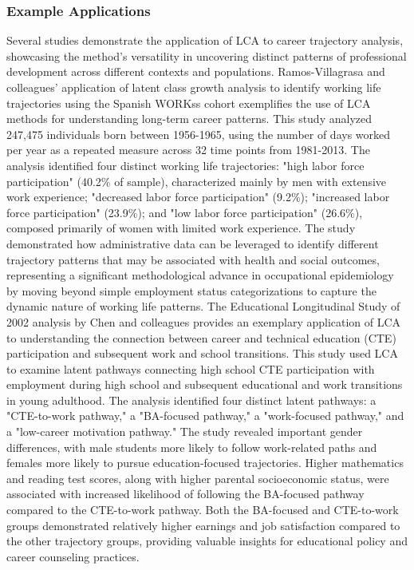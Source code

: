 \documentclass[main.tex]{subfiles}
\begin{document}
\subsubsection{Example Applications}
Several studies demonstrate the application of LCA to career trajectory analysis, showcasing the method's versatility in uncovering distinct patterns of professional development across different contexts and populations.
Ramos-Villagrasa and colleagues' application of latent class growth analysis to identify working life trajectories using the Spanish WORKss cohort exemplifies the use of LCA methods for understanding long-term career patterns\parencite{ramos2017}. This study analyzed 247,475 individuals born between 1956-1965, using the number of days worked per year as a repeated measure across 32 time points from 1981-2013. The analysis identified four distinct working life trajectories: "high labor force participation" (40.2\% of sample), characterized mainly by men with extensive work experience; "decreased labor force participation" (9.2\%); "increased labor force participation" (23.9\%); and "low labor force participation" (26.6\%), composed primarily of women with limited work experience. The study demonstrated how administrative data can be leveraged to identify different trajectory patterns that may be associated with health and social outcomes, representing a significant methodological advance in occupational epidemiology by moving beyond simple employment status categorizations to capture the dynamic nature of working life patterns.
The Educational Longitudinal Study of 2002 analysis by Chen and colleagues provides an exemplary application of LCA to understanding the connection between career and technical education (CTE) participation and subsequent work and school transitions\parencite{chen2021}. This study used LCA to examine latent pathways connecting high school CTE participation with employment during high school and subsequent educational and work transitions in young adulthood. The analysis identified four distinct latent pathways: a "CTE-to-work pathway," a "BA-focused pathway," a "work-focused pathway," and a "low-career motivation pathway." The study revealed important gender differences, with male students more likely to follow work-related paths and females more likely to pursue education-focused trajectories. Higher mathematics and reading test scores, along with higher parental socioeconomic status, were associated with increased likelihood of following the BA-focused pathway compared to the CTE-to-work pathway. Both the BA-focused and CTE-to-work groups demonstrated relatively higher earnings and job satisfaction compared to the other trajectory groups, providing valuable insights for educational policy and career counseling practices.
\end{document}
